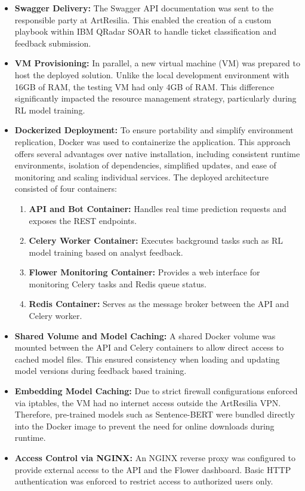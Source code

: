 \begin{itemize}
    \item \textbf{Swagger Delivery:} The Swagger API documentation was sent to the responsible party at ArtResilia. This enabled the creation of a custom playbook within IBM QRadar SOAR to handle ticket classification and feedback submission.
    \item \textbf{VM Provisioning:} In parallel, a new virtual machine (VM) was prepared to host the deployed solution. Unlike the local development environment with 16GB of RAM, the testing VM had only 4GB of RAM. This difference significantly impacted the resource management strategy, particularly during RL model training.
    \item \textbf{Dockerized Deployment:} To ensure portability and simplify environment replication, Docker was used to containerize the application. This approach offers several advantages over native installation, including consistent runtime environments, isolation of dependencies, simplified updates, and ease of monitoring and scaling individual services. The deployed architecture consisted of four containers:
    \begin{enumerate}
        \item \textbf{API and Bot Container:} Handles real time prediction requests and exposes the REST endpoints.
        \item \textbf{Celery Worker Container:} Executes background tasks such as RL model training based on analyst feedback.
        \item \textbf{Flower Monitoring Container:} Provides a web interface for monitoring Celery tasks and Redis queue status.
        \item \textbf{Redis Container:} Serves as the message broker between the API and Celery worker.
    \end{enumerate}
    \item \textbf{Shared Volume and Model Caching:} A shared Docker volume was mounted between the API and Celery containers to allow direct access to cached model files. This ensured consistency when loading and updating model versions during feedback based training.
    \item \textbf{Embedding Model Caching:} Due to strict firewall configurations enforced via iptables, the VM had no internet access outside the ArtResilia VPN. Therefore, pre-trained models such as Sentence-BERT were bundled directly into the Docker image to prevent the need for online downloads during runtime.
    \item \textbf{Access Control via NGINX:} An NGINX reverse proxy was configured to provide external access to the API and the Flower dashboard. Basic HTTP authentication was enforced to restrict access to authorized users only.
\end{itemize}

